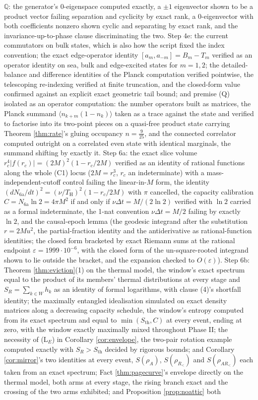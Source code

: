 \documentclass[11pt]{article}
\theoremstyle{definition}
\renewcommand{\TH}{T_{\mathrm{H}}} %
\newcommand{\Sth}{S_{\mathrm{th}}}
\begin{document}
$\mathbb{Q}$: the generator's $0$-eigenspace computed exactly, a $\pm 1$ eigenvector shown to be a product vector failing separation and cyclicity by exact rank, a $0$-eigenvector with both coefficients nonzero shown cyclic and separating by exact rank, and the invariance-up-to-phase clause discriminating the two. Step 4e: the current commutators on bulk states, which is also how the script fixed the index convention; the exact edge-operator identity $[a_m, a_{-m}] = B_m - T_m$ verified as an operator identity on sea, bulk and edge-excited states for $m = 1, 2$; the detailed-balance and difference identities of the Planck computation verified pointwise, the telescoping re-indexing verified at finite truncation, and the closed-form value confirmed against an explicit exact geometric tail bound; and premise (Q) isolated as an operator computation: the number operators built as matrices, the Planck summand $\langle n_{k+m}(1 - n_k)\rangle$ taken as a trace against the state and verified to factorise into its two-point pieces on a quasi-free product state carrying Theorem \ref{thm:rate}'s gluing occupancy $n = \tfrac{9}{25}$, and the connected correlator computed outright on a correlated even state with identical marginals, the summand shifting by exactly it. Step 6a: the exact slice volume $r_c^{4}|f(r_c)| = (2M)^{2}(1 - r_c/2M)$ verified as an identity of rational functions along the whole (C1) locus ($2M = r_c^{3}$, $r_c$ an indeterminate) with a mass-independent-cutoff control failing the linear-in-$M$ form, the identity $(dN_{\mathrm{6a}}/dt)^{2} = (\nu/\TH)^{2}(1 - r_c/2M)$ with $\pi$ cancelled, the capacity calibration $C = N_{\mathrm{6a}}\ln 2 = 4\pi M^{2}$ if and only if $\nu\Delta t = M/(2\ln 2)$ verified with $\ln 2$ carried as a formal indeterminate, the 1-nat convention $\nu\Delta t = M/2$ failing by exactly $\ln 2$, and the causal-epoch lemma (the geodesic integrand after the substitution $r = 2Mu^{2}$, the partial-fraction identity and the antiderivative as rational-function identities; the closed form bracketed by exact Riemann sums at the rational endpoint $\varepsilon = 1999 \cdot 10^{-6}$, with the closed form of the un-square-rooted integrand shown to lie outside the bracket, and the expansion checked to $O(\varepsilon)$). Step 6b: Theorem \ref{thm:eviction}(1) on the thermal model, the window's exact spectrum equal to the product of its members' thermal distributions at every stage and $S_R = \sum_{k \in W}h_k$ as an identity of formal logarithms, with clause (4)'s shortfall identity; the maximally entangled idealisation simulated on exact density matrices along a decreasing capacity schedule, the window's entropy computed from its exact spectrum and equal to $\min(\Sth, C)$ at every event, ending at zero, with the window exactly maximally mixed throughout Phase II; the necessity of (L$_E$) in Corollary \ref{cor:envelope}, the two-pair rotation example computed exactly with $S_R > \Sth$ decided by rigorous bounds; and Corollary \ref{cor:mirror}'s two identities at every event, $S(\rho_A)$, $S(\rho_{R_<})$ and $S(\rho_{AR_<})$ each taken from an exact spectrum; Fact \ref{thm:pagecurve}'s envelope directly on the thermal model, both arms at every stage, the rising branch exact and the crossing of the two arms exhibited; and Proposition \ref{prop:noattic} both 
\end{document}
